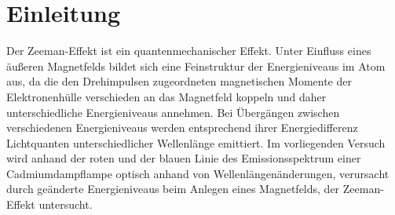 \section{Einleitung}
\label{sec:Einleitung}
Der Zeeman-Effekt ist ein quantenmechanischer Effekt.
Unter Einfluss eines äußeren Magnetfelds bildet sich eine Feinstruktur der Energieniveaus im Atom aus, da die den Drehimpulsen zugeordneten magnetischen Momente der Elektronenhülle verschieden an das Magnetfeld koppeln und daher unterschiedliche Energieniveaus annehmen. Bei Übergängen zwischen verschiedenen Energieniveaus werden entsprechend ihrer Energiedifferenz Lichtquanten unterschiedlicher Wellenlänge emittiert.
Im vorliegenden Versuch wird anhand der roten und der blauen Linie des Emissionsspektrum einer Cadmiumdampflampe
optisch anhand von Wellenlängenänderungen, verursacht durch geänderte Energieniveaus beim Anlegen eines Magnetfelds, der Zeeman-Effekt untersucht.
